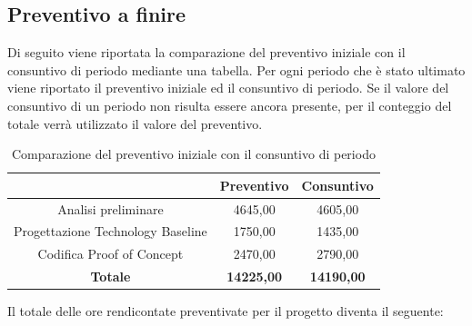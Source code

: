 \subsection{Preventivo a finire} \label{subsection:preventivo_a_finire}
Di seguito viene riportata la comparazione del preventivo iniziale con il consuntivo di periodo mediante una tabella.
Per ogni periodo che è stato ultimato viene riportato il preventivo iniziale ed il consuntivo di periodo.
Se il valore del consuntivo di un periodo non risulta essere ancora presente, per il conteggio del totale verrà utilizzato il valore del preventivo.
\begin{table}[H]
  \centering
  \renewcommand{\arraystretch}{1.8}
  \begin{tabular}{c|c|c}
    \rowcolor[HTML]{125E28}
    \multicolumn{1}{c}{\color[HTML]{FFFFFF}\textbf{Periodo}}
                                      & \multicolumn{1}{c}{\color[HTML]{FFFFFF}\textbf{Preventivo}}
                                      & \multicolumn{1}{c}{\color[HTML]{FFFFFF}\textbf{Consuntivo}}                     \\
    \hline
    Analisi preliminare               & 4645,00                                                     & 4605,00           \\
    Progettazione Technology Baseline & 1750,00                                                     & 1435,00           \\
    Codifica Proof of Concept         & 2470,00                                                     & 2790,00           \\
    \textbf{Totale}                   & \textbf{14225,00}                                           & \textbf{14190,00} \\
  \end{tabular}
  \caption{Comparazione del preventivo iniziale con il consuntivo di periodo}
\end{table}

\pagebreak
Il totale delle ore rendicontate preventivate per il progetto diventa il seguente:


